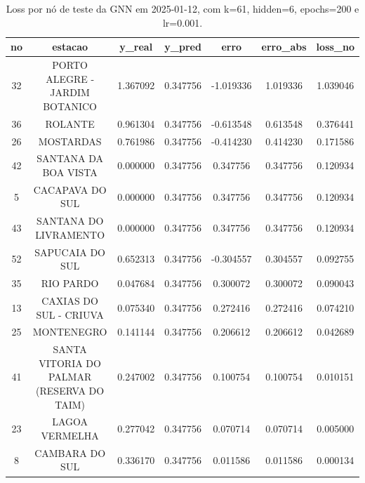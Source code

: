 \begin{table}[h]
\centering
\caption{Loss por nó de teste da GNN em 2025-01-12, com k=61, hidden=6, epochs=200 e lr=0.001.}
\label{tab:gnn_loss_nodes_k61_hidden6}
\begin{tabular}{ccccccc}
\toprule
no & estacao & y\_real & y\_pred & erro & erro\_abs & loss\_no \\
\midrule
32 & PORTO ALEGRE - JARDIM BOTANICO & 1.367092 & 0.347756 & -1.019336 & 1.019336 & 1.039046 \\
36 & ROLANTE & 0.961304 & 0.347756 & -0.613548 & 0.613548 & 0.376441 \\
26 & MOSTARDAS & 0.761986 & 0.347756 & -0.414230 & 0.414230 & 0.171586 \\
42 & SANTANA DA BOA VISTA & 0.000000 & 0.347756 & 0.347756 & 0.347756 & 0.120934 \\
5 & CACAPAVA DO SUL & 0.000000 & 0.347756 & 0.347756 & 0.347756 & 0.120934 \\
43 & SANTANA DO LIVRAMENTO & 0.000000 & 0.347756 & 0.347756 & 0.347756 & 0.120934 \\
52 & SAPUCAIA DO SUL & 0.652313 & 0.347756 & -0.304557 & 0.304557 & 0.092755 \\
35 & RIO PARDO & 0.047684 & 0.347756 & 0.300072 & 0.300072 & 0.090043 \\
13 & CAXIAS DO SUL - CRIUVA & 0.075340 & 0.347756 & 0.272416 & 0.272416 & 0.074210 \\
25 & MONTENEGRO & 0.141144 & 0.347756 & 0.206612 & 0.206612 & 0.042689 \\
41 & SANTA VITORIA DO PALMAR (RESERVA DO TAIM) & 0.247002 & 0.347756 & 0.100754 & 0.100754 & 0.010151 \\
23 & LAGOA VERMELHA & 0.277042 & 0.347756 & 0.070714 & 0.070714 & 0.005000 \\
8 & CAMBARA DO SUL & 0.336170 & 0.347756 & 0.011586 & 0.011586 & 0.000134 \\
\bottomrule
\end{tabular}
\end{table}
